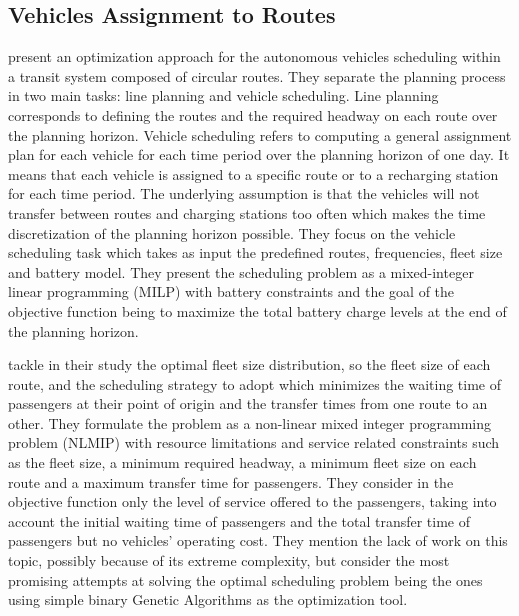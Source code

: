 \documentclass[12pt,a4paper]{article}
\begin{document}
\subsection{Vehicles Assignment to Routes}\label{luts}
\cite{luts} present an optimization approach for the autonomous vehicles scheduling within a transit system composed of circular routes. They separate the planning process in two main tasks: line planning and vehicle scheduling. Line planning corresponds to defining the routes and the required headway on each route over the planning horizon. Vehicle scheduling refers to computing a general assignment plan for each vehicle for each time period over the planning horizon of one day. It means that each vehicle is assigned to a specific route or to a recharging station for each time period. The underlying assumption is that the vehicles will not transfer between routes and charging stations too often which makes the time discretization of the planning horizon possible. They focus on the vehicle scheduling task which takes as input the predefined routes, frequencies, fleet size and battery model. They present the scheduling problem as a mixed-integer linear programming (MILP) with battery constraints and the goal of the objective function being to maximize the total battery charge levels at the end of the planning horizon. 

\cite{ga} tackle in their study the optimal fleet size distribution, so the fleet size of each route, and the scheduling strategy to adopt which minimizes the waiting time of passengers at their point of origin and the transfer times from one route to an other. They formulate the problem as a non-linear mixed integer programming problem (NLMIP) with resource limitations and service related constraints such as the fleet size, a minimum required headway, a minimum fleet size on each route and a maximum transfer time for passengers. They consider in the objective function only the level of service offered to the passengers, taking into account the initial waiting time of passengers and the total transfer time of passengers but no vehicles' operating cost. They mention the lack of work on this topic, possibly because of its extreme complexity, but consider the most promising attempts at solving the optimal scheduling problem being the ones using simple binary Genetic Algorithms as the optimization tool. 
\end{document}
